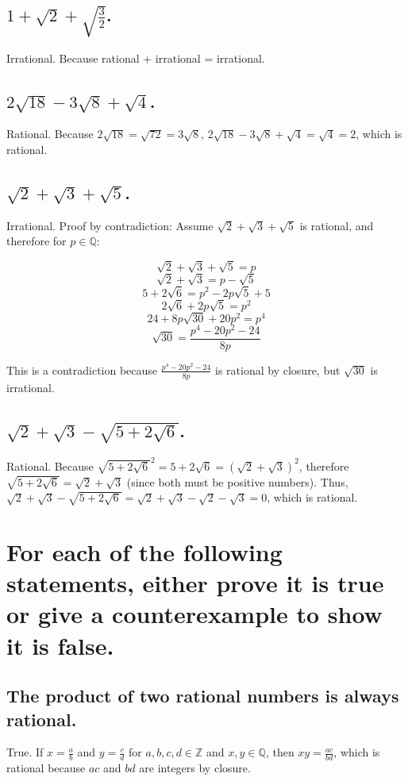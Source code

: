 \documentclass[12pt]{article}
\begin{document}
\subsection{$1 + \sqrt{2} + \sqrt{\frac{3}{2}}$.}
Irrational. Because rational + irrational = irrational.

\subsection{$2 \sqrt{18} - 3 \sqrt{8} + \sqrt{4}$.}
Rational. Because $2 \sqrt{18} = \sqrt{72} = 3 \sqrt{8}$, 
$2 \sqrt{18} - 3 \sqrt{8} + \sqrt{4} = \sqrt{4} = 2$, which is rational.

\subsection{$\sqrt{2} + \sqrt{3} + \sqrt{5}$.}
Irrational. Proof by contradiction: Assume $\sqrt{2} + \sqrt{3} + \sqrt{5}$ is rational,
and therefore for $p \in \mathds{Q}$: 

$$\sqrt{2} + \sqrt{3} + \sqrt{5} = p$$
$$\sqrt{2} + \sqrt{3} = p - \sqrt{5}$$
$$5 + 2 \sqrt{6} = p^2 - 2p \sqrt{5} + 5$$
$$2 \sqrt{6} + 2p \sqrt{5} = p^2$$
$$24 + 8p \sqrt{30} + 20p^2 = p^4$$
$$\sqrt{30} = \frac{p^4 - 20p^2 - 24}{8p}$$

This is a contradiction because $\frac{p^4 - 20p^2 - 24}{8p}$ is rational by closure, 
but $\sqrt{30}$ is irrational.


\subsection{$\sqrt{2} + \sqrt{3} - \sqrt{5 + 2 \sqrt{6}}$.}
Rational. Because $\sqrt{5 + 2 \sqrt{6}}^2 = 5 + 2 \sqrt{6} = ( \sqrt{2} + \sqrt{3} )^2$,
therefore $\sqrt{5 + 2 \sqrt{6}} = \sqrt{2} + \sqrt{3}$ (since both must be positive numbers).
Thus, $\sqrt{2} + \sqrt{3} - \sqrt{5 + 2 \sqrt{6}} = \sqrt{2} + \sqrt{3} - \sqrt{2} - \sqrt{3} = 0$,
which is rational.

\section{For each of the following statements, either prove it is true or give a counterexample to show it is false.}
\subsection{The product of two rational numbers is always rational.}
True. If $x = \frac{a}{b}$ and $y = \frac{c}{d}$ for $a,b,c,d \in \mathds{Z}$ and $x,y \in \mathds{Q}$, 
then $xy = \frac{ac}{bd}$, which is rational because $ac$ and $bd$ are integers by closure.
\end{document}
